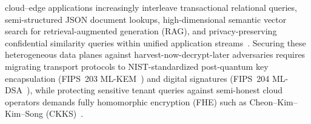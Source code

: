 \documentclass[10pt,journal,compsoc]{IEEEtran}
\begin{document}
\maketitle
\IEEEdisplaynontitleabstractindextext
\IEEEpeerreviewmaketitle

 cloud--edge applications increasingly interleave transactional relational queries, semi-structured JSON document lookups, high-dimensional semantic vector search for retrieval-augmented generation (RAG), and privacy-preserving confidential similarity queries within unified application streams~\cite{pan2024vectordbsurvey,chen2024bgem3}. Securing these heterogeneous data planes against harvest-now-decrypt-later adversaries requires migrating transport protocols to NIST-standardized post-quantum key encapsulation (FIPS~203 ML-KEM~\cite{nist_fips203_2024}) and digital signatures (FIPS~204 ML-DSA~\cite{nist_fips204_2024}), while protecting sensitive tenant queries against semi-honest cloud operators demands fully homomorphic encryption (FHE) such as Cheon--Kim--Kim--Song (CKKS)~\cite{cheon2017ckks,albadawi2022openfhe}.
\end{document}
